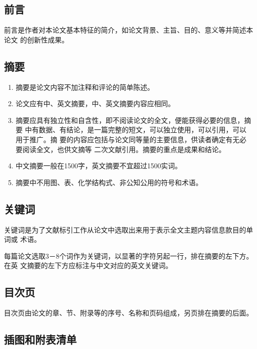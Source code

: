 \documentclass[oneside, phd]{njuthesis}
\begin{document}
\subsection{前言}

前言是作者对本论文基本特征的简介，如论文背景、主旨、目的、意义等并简述本论文
的创新性成果。

\subsection{摘要}

\begin{enumerate}

\item 摘要是论文内容不加注释和评论的简单陈述。

\item 论文应有中、英文摘要，中、英文摘要内容应相同。

\item 摘要应具有独立性和自含性，即不阅读论文的全文，便能获得必要的信息，摘要
中有数据、有结论，是一篇完整的短文，可以独立使用，可以引用，可以用于推广。摘
要的内容应包括与论文同等量的主要信息，供读者确定有无必要阅读全文，也供文摘等
二次文献引用。摘要的重点是成果和结论。

\item 中文摘要一般在1500字，英文摘要不宜超过1500实词。

\item 摘要中不用图、表、化学结构式、非公知公用的符号和术语。

\end{enumerate}

\subsection{关键词}

关键词是为了文献标引工作从论文中选取出来用于表示全文主题内容信息款目的单词或
术语。

每篇论文选取3－8个词作为关键词，以显著的字符另起一行，排在摘要的左下方。在英
文摘要的左下方应标注与中文对应的英文关键词。

\subsection{目次页}

目次页由论文的章、节、附录等的序号、名称和页码组成，另页排在摘要的后面。

\subsection{插图和附表清单}
\end{document}
